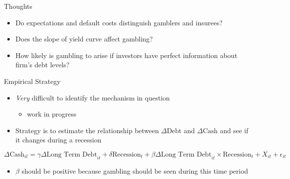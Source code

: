 \documentclass[ignorenonframetext,aspectratio=169]{beamer}
\providecommand{\tightlist}{%
  \setlength{\itemsep}{0pt}\setlength{\parskip}{0pt}}
\begin{document}
\begin{frame}{Thoughts}

\begin{itemize}
\item
  Do expectations and default costs distinguish gamblers and insurees?
\item
  Does the slope of yield curve affect gambling?
\item
  How likely is gambling to arise if investors have perfect information
  about firm's debt levels?
\end{itemize}

\end{frame}

\begin{frame}{Empirical Strategy}

\begin{itemize}
\tightlist
\item
  \emph{Very} difficult to identify the mechanism in question

  \begin{itemize}
  \tightlist
  \item
    work in progress
  \end{itemize}
\item
  Strategy is to estimate the relationship between \(\Delta\text{Debt}\)
  and \(\Delta\text{Cash}\) and see if it changes during a recession
\end{itemize}

\[\Delta\text{Cash}_{it} = \gamma\Delta\text{Long Term Debt}_{it} + 
\delta\text{Recession}_t + 
\beta\Delta\text{Long Term Debt}_{it} \times \text{Recession}_t + X_{it} + \epsilon_{it}\]

\begin{itemize}
\tightlist
\item
  \(\beta\) should be positive because gambling should be seen during
  this time period
\end{itemize}

\end{frame}
\end{document}
